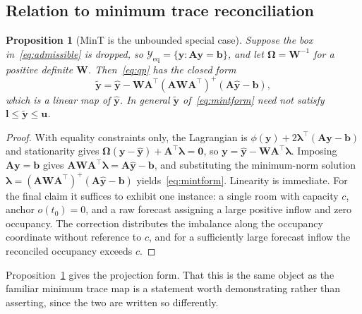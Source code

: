 \documentclass[11pt]{article}
\theoremstyle{plain}
\newtheorem{proposition}[theorem]{Proposition}
\theoremstyle{definition}
\theoremstyle{remark}
\newcommand{\bA}{\bm{A}}
\newcommand{\by}{\bm{y}}
\newcommand{\bb}{\bm{b}}
\newcommand{\bOm}{\bm{\Omega}}
\newcommand{\yhat}{\hat{\by}}
\newcommand{\ytil}{\tilde{\by}}
\newcommand{\cY}{\mathcal{Y}}
\begin{document}
\subsection{Relation to minimum trace reconciliation}

\begin{proposition}[MinT is the unbounded special case]
\label{prop:mint}
Suppose the box in~\eqref{eq:admissible} is dropped, so $\cY_{\mathrm{eq}} = \{\by : \bA\by=\bb\}$, and let $\bOm = \bm{W}^{-1}$ for a positive definite $\bm{W}$. Then~\eqref{eq:qp} has the closed form
\begin{equation}
\ytil = \yhat - \bm{W}\bA^{\top}\left(\bA\bm{W}\bA^{\top}\right)^{+}\left(\bA\yhat - \bb\right),
\label{eq:mintform}
\end{equation}
which is a linear map of $\yhat$. In general $\ytil$ of~\eqref{eq:mintform} need not satisfy $\bm{l}\le\ytil\le\bm{u}$.
\end{proposition}
\begin{proof}
With equality constraints only, the Lagrangian is $\phi(\by) + 2\bm{\lambda}^{\top}(\bA\by-\bb)$ and stationarity gives $\bOm(\by-\yhat) + \bA^{\top}\bm{\lambda} = \bm{0}$, so $\by = \yhat - \bm{W}\bA^{\top}\bm{\lambda}$. Imposing $\bA\by=\bb$ gives $\bA\bm{W}\bA^{\top}\bm{\lambda} = \bA\yhat - \bb$, and substituting the minimum-norm solution $\bm{\lambda} = (\bA\bm{W}\bA^{\top})^{+}(\bA\yhat-\bb)$ yields~\eqref{eq:mintform}. Linearity is immediate. For the final claim it suffices to exhibit one instance: a single room with capacity $c$, anchor $o(t_0)=0$, and a raw forecast assigning a large positive inflow and zero occupancy. The correction distributes the imbalance along the occupancy coordinate without reference to $c$, and for a sufficiently large forecast inflow the reconciled occupancy exceeds $c$.
\end{proof}

Proposition~\ref{prop:mint} gives the projection form. That this is the same object as the familiar minimum trace map is a statement worth demonstrating rather than asserting, since the two are written so differently.
\end{document}
